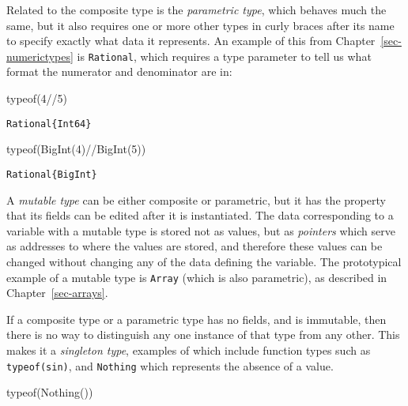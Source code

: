 \documentclass[
  letterpaper,
  DIV=11,
  numbers=noendperiod]{scrreprt}
\newenvironment{Shaded}{\begin{snugshade}}{\end{snugshade}}
\newcommand{\FloatTok}[1]{\textcolor[rgb]{0.68,0.00,0.00}{#1}}
\newcommand{\FunctionTok}[1]{\textcolor[rgb]{0.28,0.35,0.67}{#1}}
\newcommand{\NormalTok}[1]{\textcolor[rgb]{0.00,0.23,0.31}{#1}}
\newcommand{\OperatorTok}[1]{\textcolor[rgb]{0.37,0.37,0.37}{#1}}
\begin{document}
Related to the composite type is the \emph{parametric type}, which
behaves much the same, but it also requires one or more other types in
curly braces after its name to specify exactly what data it represents.
An example of this from Chapter~\ref{sec-numerictypes} is
\texttt{Rational}, which requires a type parameter to tell us what
format the numerator and denominator are in:

\begin{Shaded}
\begin{Highlighting}[]
\FunctionTok{typeof}\NormalTok{(}\FloatTok{4}\OperatorTok{//}\FloatTok{5}\NormalTok{)}
\end{Highlighting}
\end{Shaded}

\begin{verbatim}
Rational{Int64}
\end{verbatim}

\begin{Shaded}
\begin{Highlighting}[]
\FunctionTok{typeof}\NormalTok{(}\FunctionTok{BigInt}\NormalTok{(}\FloatTok{4}\NormalTok{)}\OperatorTok{//}\FunctionTok{BigInt}\NormalTok{(}\FloatTok{5}\NormalTok{))}
\end{Highlighting}
\end{Shaded}

\begin{verbatim}
Rational{BigInt}
\end{verbatim}

A \emph{mutable type} can be either composite or parametric, but it has
the property that its fields can be edited after it is instantiated. The
data corresponding to a variable with a mutable type is stored not as
values, but as \emph{pointers} which serve as addresses to where the
values are stored, and therefore these values can be changed without
changing any of the data defining the variable. The prototypical example
of a mutable type is \texttt{Array} (which is also parametric), as
described in Chapter~\ref{sec-arrays}.

If a composite type or a parametric type has no fields, and is
immutable, then there is no way to distinguish any one instance of that
type from any other. This makes it a \emph{singleton type}, examples of
which include function types such as \texttt{typeof(sin)}, and
\texttt{Nothing} which represents the absence of a value.

\begin{Shaded}
\begin{Highlighting}[]
\FunctionTok{typeof}\NormalTok{(}\FunctionTok{Nothing}\NormalTok{())}
\end{Highlighting}
\end{Shaded}
\end{document}
